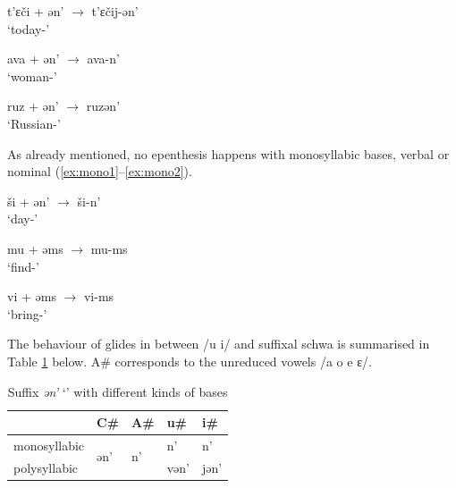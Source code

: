 \documentclass[a4paper, 12pt]{article}
\begin{document}
\begin{minipage}[t]{.3\linewidth}
\ex\label{ex:u2}
	t'ɛči + ən' $\rightarrow$ t'ɛčij-ən' \\`today-{\Gen}'
\xe
\end{minipage}	
\hfill
\begin{minipage}[t]{.315\linewidth}
\ex\label{ex:a2}
	ava + ən' $\rightarrow$ ava-n' \\`woman-{\Gen}'
\xe
\end{minipage}	
\hfill
\begin{minipage}[t]{.33\linewidth}
\ex\label{ex:z2}
	ruz + ən' $\rightarrow$ ruzən' \\`Russian-{\Gen}'
\xe
\end{minipage}
	
	\noindent As already mentioned, no epenthesis happens with monosyllabic bases, verbal or nominal (\ref{ex:mono1}--\ref{ex:mono2}).
	
\begin{minipage}[t]{.3\linewidth}
\ex\label{ex:mono1}
	ši + ən' $\rightarrow$ ši-n' \\`day-{\Gen}'
\xe
\end{minipage}
\hfill
\begin{minipage}[t]{.3\linewidth}
\ex\label{ex:}
	mu + əms $\rightarrow$ mu-ms \\`find-{\Inf}'
\xe
\end{minipage}	
\hfill
\begin{minipage}[t]{.3\linewidth}
\ex\label{ex:mono2}
	vi + əms $\rightarrow$ vi-ms \\`bring-{\Inf}'
\xe
\end{minipage}
	
	\noindent The behaviour of glides in between /u i/ and suffixal schwa is summarised in Table \ref{tab:glidesschwa} below. A\# corresponds to the unreduced vowels /a o e ɛ/.
	
\begin{table}[H]
\centering
\begin{tabular}{lllll}
\toprule
               & C\#                  & A\#                 & u\#  & i\#  \\
\midrule
monosyllabic      & \multirow{2}{*}{ən'} & \multirow{2}{*}{n'} & n'   & n'   \\
polysyllabic &                      &                     & vən' & jən'\\
\bottomrule
\end{tabular}
\caption{Suffix \emph{ən'} `{\Gen}' with different kinds of bases}
\label{tab:glidesschwa}
\end{table}
	
\end{document}

